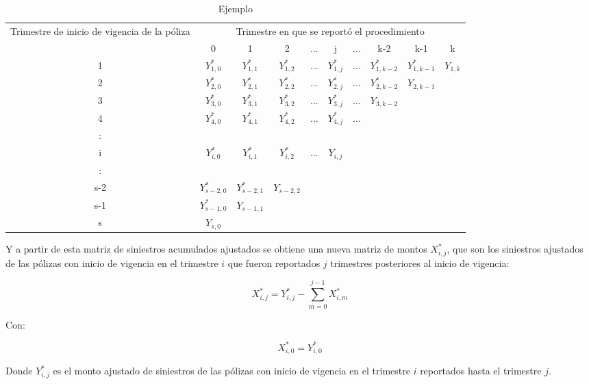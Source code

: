 \documentclass[11pt,twoside,openright,spanish]{report}
\numberwithin{equation}{chapter}
\numberwithin{figure}{chapter}
\numberwithin{table}{chapter}
\begin{document}
	\begin{table}[ht]
		\centering
		\caption{Ejemplo }
		\begin{tabularx}{\linewidth}{ c |ccccccccc}
			\multirow{2}{4cm}{Trimestre de inicio de vigencia de la póliza}
			& \multicolumn{9}{c}{Trimestre en que se reportó el procedimiento} \\ 
			& 0  & 1 & 2 & $ \dots $ & j & $\dots $ & k-2 & k-1 &  k \\
			\midrule
			1      &  $Y_{1,0}^{*}$ & $Y_{1,1}^{*}$ & $Y_{1,2}^{*}$ & $ \dots $ & $Y_{1,j}^{*}$ & $ \dots $ & $Y_{1,k-2}^{*}$ & $Y_{1,k-1}^{*}$ & $Y_{1,k}^{}$ \\
			2      &  $Y_{2,0}^{*}$ & $Y_{2,1}^{*}$ & $Y_{2,2}^{*}$ & $ \dots $ & $Y_{2,j}^{*}$ & $ \dots $ & $Y_{2,k-2}^{*}$ & $Y_{2,k-1}^{}$ & \\
			3      &  $Y_{3,0}^{*}$ & $Y_{3,1}^{*}$ & $Y_{3,2}^{*}$ & $ \dots $ & $Y_{3,j}^{*}$ & $ \dots $ & $Y_{3,k-2}^{}$ & & \\
			4      &  $Y_{4,0}^{*}$ & $Y_{4,1}^{*}$ & $Y_{4,2}^{*}$ & $ \dots $ & $Y_{4,j}^{*}$ & $ \dots $ & & & \\
			:      & & & & & & & & & \\
			i      &  $Y_{i,0}^{*}$ & $Y_{i,1}^{*}$ & $Y_{i,2}^{*}$ & $ \dots $ & $Y_{i,j}^{}$ & & & & \\
			:      & & & & & & & & & \\
			s-2      &  $Y_{s-2,0}^{*}$ & $Y_{s-2,1}^{*}$ & $Y_{s-2,2}^{}$ & & & & & & \\
			s-1      &  $Y_{s-1,0}^{*}$ & $Y_{s-1,1}^{}$ & & & & & & & \\
			s      &  $Y_{s,0}^{}$ & & & & & & & & \\
		\end{tabularx}
	\end{table}\label{matrizsiniestrosacumulados}
	
	Y a partir de esta matriz de siniestros acumulados ajustados se obtiene una nueva matriz de montos $X_{i,j}^{*}$, que son los siniestros ajustados de las pólizas con inicio de vigencia en el trimestre $i$ que fueron reportados $j$ trimestres posteriores al inicio de vigencia:
	
	$${X}_{i,j}^{*}={Y}_{i,j}^{*}-\sum _{m=0}^{j-1}{X}_{i,m}^{*}$$	
	 
	Con:
	
	$${X}_{i,0}^{*}={Y}_{i,0}^{*}$$ 
	
	Donde ${Y}_{i,j}^{*}$ es el monto ajustado de siniestros de las pólizas con inicio de vigencia en el trimestre $i$ reportados hasta el trimestre $j$. 
	
\end{document}

